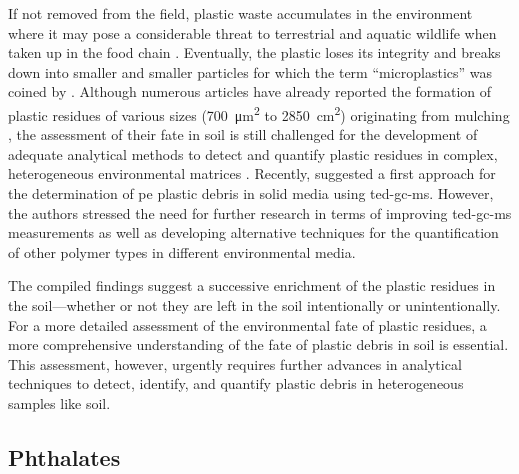 If not removed from the field, plastic waste accumulates in the environment where it may pose a considerable threat to terrestrial and aquatic wildlife when taken up in the food chain \citep{BarnesAccumulation2009,DuisMicroplastics2016,RilligMicroplastic2012,SivanNew2011,TeutenTransport2009}. Eventually, the plastic loses its integrity and breaks down into smaller and smaller particles for which the term ``microplastics'' was coined by \citet{ThompsonLost2004}. Although numerous articles have already reported the formation of plastic residues of various sizes (\SI{700}{\square\micro\meter} to \SI{2850}{\square\centi\meter}) originating from mulching \citep[for example][]{BriassoulisAnalysis2015,FeuilloleyDegradation2005,KyrikouBiodegradation2007,RamosPolyethylene2015}, the assessment of their fate in soil is still challenged for the development of adequate analytical methods to detect and quantify plastic residues in complex, heterogeneous environmental matrices \citep{RilligMicroplastic2012}. Recently, \citet{DumichenAnalysis2015} suggested a first approach for the determination of \ac{pe} plastic debris in solid media using \ac{ted-gc-ms}. However, the authors stressed the need for further research in terms of improving \ac{ted-gc-ms} measurements as well as developing alternative techniques for the quantification of other polymer types in different environmental media.

The compiled findings suggest a successive enrichment of the plastic residues in the soil---whether or not they are left in the soil intentionally or unintentionally. For a more detailed assessment of the environmental fate of plastic residues, a more comprehensive understanding of the fate of plastic debris in soil is essential. This assessment, however, urgently requires further advances in analytical techniques to detect, identify, and quantify plastic debris in heterogeneous samples like soil.

\subsection{Phthalates}
\label{sec:plastic-mulching:phthalates}

